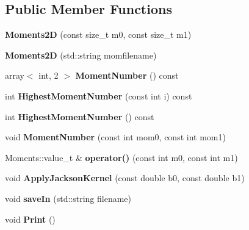 \subsection*{Public Member Functions}
\begin{DoxyCompactItemize}
\item 
{\bfseries Moments2D} (const size\+\_\+t m0, const size\+\_\+t m1)\hypertarget{classchebyshev_1_1_moments2_d_af0b8f711109555572b8d817bef39bbae}{}\label{classchebyshev_1_1_moments2_d_af0b8f711109555572b8d817bef39bbae}

\item 
{\bfseries Moments2D} (std\+::string momfilename)\hypertarget{classchebyshev_1_1_moments2_d_adab0cd1f735cbb3f261c44d7d43b58e5}{}\label{classchebyshev_1_1_moments2_d_adab0cd1f735cbb3f261c44d7d43b58e5}

\item 
array$<$ int, 2 $>$ {\bfseries Moment\+Number} () const \hypertarget{classchebyshev_1_1_moments2_d_a3bf7894afbe847204c61e08b9aa43cde}{}\label{classchebyshev_1_1_moments2_d_a3bf7894afbe847204c61e08b9aa43cde}

\item 
int {\bfseries Highest\+Moment\+Number} (const int i) const \hypertarget{classchebyshev_1_1_moments2_d_a65168ecb2bb52a5bd38b96e1a4df921a}{}\label{classchebyshev_1_1_moments2_d_a65168ecb2bb52a5bd38b96e1a4df921a}

\item 
int {\bfseries Highest\+Moment\+Number} () const \hypertarget{classchebyshev_1_1_moments2_d_ada8a445140a16b5386faa0516a90b6a7}{}\label{classchebyshev_1_1_moments2_d_ada8a445140a16b5386faa0516a90b6a7}

\item 
void {\bfseries Moment\+Number} (const int mom0, const int mom1)\hypertarget{classchebyshev_1_1_moments2_d_af14d8beef67d68836fb6740f44b3597a}{}\label{classchebyshev_1_1_moments2_d_af14d8beef67d68836fb6740f44b3597a}

\item 
Moments\+::value\+\_\+t \& {\bfseries operator()} (const int m0, const int m1)\hypertarget{classchebyshev_1_1_moments2_d_ac762b2cd08185994af2ad805f5b49691}{}\label{classchebyshev_1_1_moments2_d_ac762b2cd08185994af2ad805f5b49691}

\item 
void {\bfseries Apply\+Jackson\+Kernel} (const double b0, const double b1)\hypertarget{classchebyshev_1_1_moments2_d_ad83287368165d03f619b8a7578623b43}{}\label{classchebyshev_1_1_moments2_d_ad83287368165d03f619b8a7578623b43}

\item 
void {\bfseries save\+In} (std\+::string filename)\hypertarget{classchebyshev_1_1_moments2_d_a27dfe3c9ac5e9477fccc1c1fcc3343cf}{}\label{classchebyshev_1_1_moments2_d_a27dfe3c9ac5e9477fccc1c1fcc3343cf}

\item 
void {\bfseries Print} ()\hypertarget{classchebyshev_1_1_moments2_d_a7ace12d910b2fe332192f88fc0785a7c}{}\label{classchebyshev_1_1_moments2_d_a7ace12d910b2fe332192f88fc0785a7c}

\end{DoxyCompactItemize}
